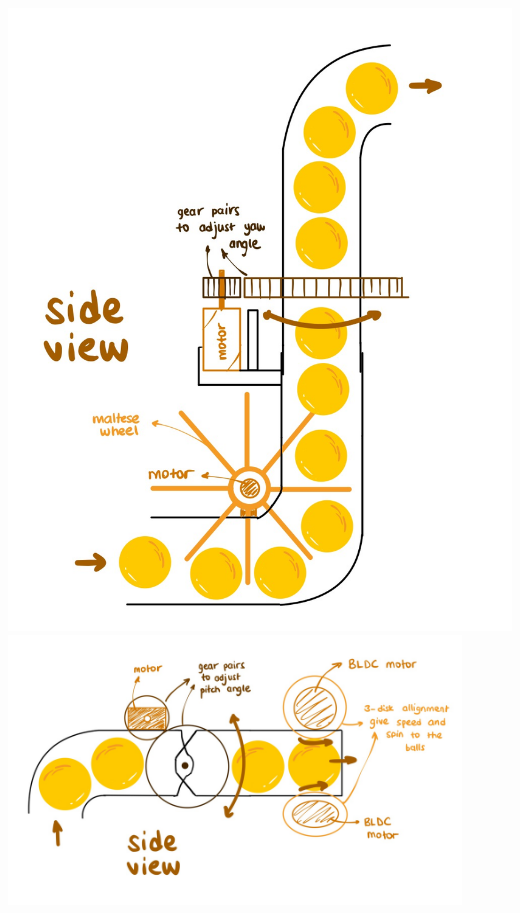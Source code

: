 \documentclass[12pt]{article}
\begin{document}
\hfill
\begin{minipage}[t]{0.25\textwidth}
    \centering
    \includegraphics[width=\textwidth]{best_concept/side_feeder.jpeg}
    \vspace{1em}
    \includegraphics[width=0.9\textwidth]{best_concept/side.jpeg}
    \vspace{1em}

\end{minipage}
\end{document}
